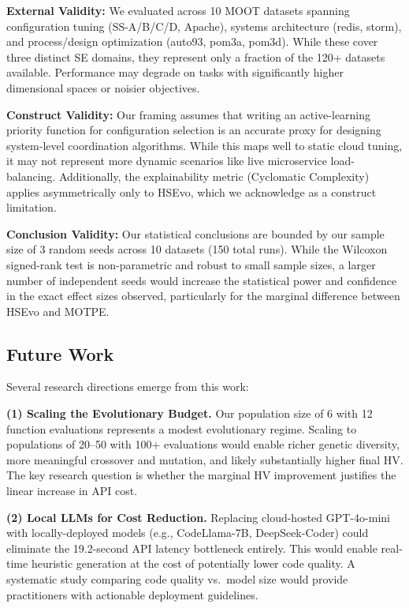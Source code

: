 \documentclass[sigconf,nonacm]{acmart}
\begin{document}
\textbf{External Validity:} We evaluated across 10 MOOT datasets spanning configuration tuning (SS-A/B/C/D, Apache), systems architecture (redis, storm), and process/design optimization (auto93, pom3a, pom3d). While these cover three distinct SE domains, they represent only a fraction of the 120+ datasets available. Performance may degrade on tasks with significantly higher dimensional spaces or noisier objectives.

\textbf{Construct Validity:} Our framing assumes that writing an active-learning priority function for configuration selection is an accurate proxy for designing system-level coordination algorithms. While this maps well to static cloud tuning, it may not represent more dynamic scenarios like live microservice load-balancing. Additionally, the explainability metric (Cyclomatic Complexity) applies asymmetrically only to HSEvo, which we acknowledge as a construct limitation.

\textbf{Conclusion Validity:} Our statistical conclusions are bounded by our sample size of 3 random seeds across 10 datasets (150 total runs). While the Wilcoxon signed-rank test is non-parametric and robust to small sample sizes, a larger number of independent seeds would increase the statistical power and confidence in the exact effect sizes observed, particularly for the marginal difference between HSEvo and MOTPE.

\subsection{Future Work}
Several research directions emerge from this work:

\textbf{(1) Scaling the Evolutionary Budget.} Our population size of 6 with 12 function evaluations represents a modest evolutionary regime. Scaling to populations of 20--50 with 100+ evaluations would enable richer genetic diversity, more meaningful crossover and mutation, and likely substantially higher final HV. The key research question is whether the marginal HV improvement justifies the linear increase in API cost.

\textbf{(2) Local LLMs for Cost Reduction.} Replacing cloud-hosted GPT-4o-mini with locally-deployed models (e.g., CodeLlama-7B, DeepSeek-Coder) could eliminate the 19.2-second API latency bottleneck entirely. This would enable real-time heuristic generation at the cost of potentially lower code quality. A systematic study comparing code quality vs.\ model size would provide practitioners with actionable deployment guidelines.
\end{document}
